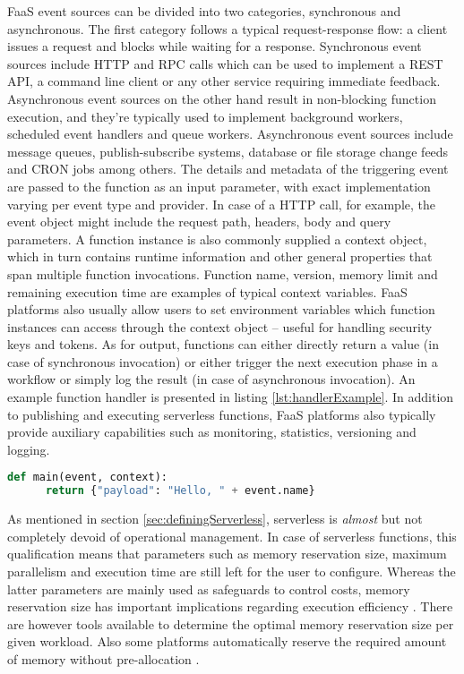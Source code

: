 FaaS event sources can be divided into two categories, synchronous and asynchronous. The first category follows a typical request-response flow: a client issues a request and blocks while waiting for a response. Synchronous event sources include HTTP and RPC calls which can be used to implement a REST API, a command line client or any other service requiring immediate feedback. Asynchronous event sources on the other hand result in non-blocking function execution, and they're typically used to implement background workers, scheduled event handlers and queue workers. Asynchronous event sources include message queues, publish-subscribe systems, database or file storage change feeds and CRON jobs among others. The details and metadata of the triggering event are passed to the function as an input parameter, with exact implementation varying per event type and provider. In case of a HTTP call, for example, the event object might include the request path, headers, body and query parameters. A function instance is also commonly supplied a context object, which in turn contains runtime information and other general properties that span multiple function invocations. Function name, version, memory limit and remaining execution time are examples of typical context variables. FaaS platforms also usually allow users to set environment variables which function instances can access through the context object -- useful for handling security keys and tokens. As for output, functions can either directly return a value (in case of synchronous invocation) or either trigger the next execution phase in a workflow or simply log the result (in case of asynchronous invocation). An example function handler is presented in listing \ref{lst:handlerExample}. In addition to publishing and executing serverless functions, FaaS platforms also typically provide auxiliary capabilities such as monitoring, statistics, versioning and logging. \parencite{cncf18serverlessWG}

\renewcommand\thelstlisting{\arabic{lstlisting}}
\setcounter{lstlisting}{0}
\begin{lstlisting}[language=Python,caption=Example FaaS handler,captionpos=b,label=lst:handlerExample,showstringspaces=false,belowskip=2em,frame=tb,aboveskip=2em]
  def main(event, context):
      return {"payload": "Hello, " + event.name}
\end{lstlisting}

As mentioned in section \ref{sec:definingServerless}, serverless is \textit{almost} but not completely devoid of operational management. In case of serverless functions, this qualification means that parameters such as memory reservation size, maximum parallelism and execution time are still left for the user to configure. Whereas the latter parameters are mainly used as safeguards to control costs, memory reservation size has important implications regarding execution efficiency \parencite{lloydserverless}. There are however tools available to determine the optimal memory reservation size per given workload. Also some platforms automatically reserve the required amount of memory without pre-allocation \parencite{microsoft18azureFunctions}.

